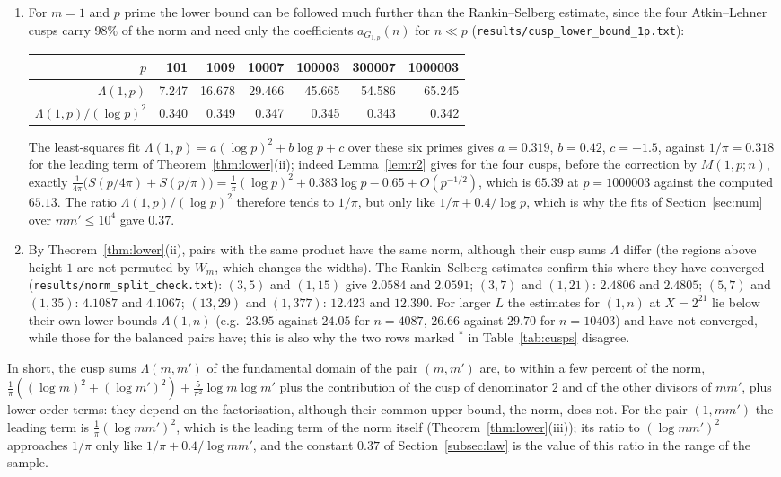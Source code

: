 ﻿\documentclass[11pt]{amsart}
\theoremstyle{remark}
\begin{document}
\begin{enumerate}[label=(\alph*),leftmargin=2.2em]
\item For $m=1$ and $p$ prime the lower bound can be followed much further than the Rankin--Selberg estimate, since the four Atkin--Lehner cusps carry $98\%$ of the norm and need only the coefficients $a_{G_{1,p}}(n)$ for $n\ll p$ (\texttt{results/cusp\_lower\_bound\_1p.txt}):
\begin{center}
\small
\begin{tabular}{r|rrrrrr}
$p$ & 101 & 1009 & 10007 & 100003 & 300007 & 1000003\\
\hline
$\Lambda(1,p)$ & 7.247 & 16.678 & 29.466 & 45.665 & 54.586 & 65.245\\
$\Lambda(1,p)/(\log p)^2$ & 0.340 & 0.349 & 0.347 & 0.345 & 0.343 & 0.342\\
\end{tabular}
\end{center}
The least-squares fit $\Lambda(1,p)=a(\log p)^2+b\log p+c$ over these six primes gives $a=0.319$, $b=0.42$, $c=-1.5$, against $1/\pi=0.318$ for the leading term of Theorem~\ref{thm:lower}(ii); indeed Lemma~\ref{lem:r2} gives for the four cusps, before the correction by $M(1,p;n)$, exactly $\frac1{4\pi}\bigl(S(p/4\pi)+S(p/\pi)\bigr)=\frac1\pi(\log p)^2+0.383\log p-0.65+O(p^{-1/2})$, which is $65.39$ at $p=1000003$ against the computed $65.13$. The ratio $\Lambda(1,p)/(\log p)^2$ therefore tends to $1/\pi$, but only like $1/\pi+0.4/\log p$, which is why the fits of Section~\ref{sec:num} over $mm'\le10^4$ gave $0.37$.
\item By Theorem~\ref{thm:lower}(ii), pairs with the same product have the same norm, although their cusp sums $\Lambda$ differ (the regions above height $1$ are not permuted by $W_m$, which changes the widths). The Rankin--Selberg estimates confirm this where they have converged (\texttt{results/norm\_split\_check.txt}): $(3,5)$ and $(1,15)$ give $2.0584$ and $2.0591$; $(3,7)$ and $(1,21)$: $2.4806$ and $2.4805$; $(5,7)$ and $(1,35)$: $4.1087$ and $4.1067$; $(13,29)$ and $(1,377)$: $12.423$ and $12.390$. For larger $L$ the estimates for $(1,n)$ at $X=2^{21}$ lie below their own lower bounds $\Lambda(1,n)$ (e.g.\ $23.95$ against $24.05$ for $n=4087$, $26.66$ against $29.70$ for $n=10403$) and have not converged, while those for the balanced pairs have; this is also why the two rows marked $^*$ in Table~\ref{tab:cusps} disagree.
\end{enumerate}
In short, the cusp sums $\Lambda(m,m')$ of the fundamental domain of the pair $(m,m')$ are, to within a few percent of the norm, $\frac1\pi((\log m)^2+(\log m')^2)+\frac5{\pi^2}\log m\log m'$ plus the contribution of the cusp of denominator $2$ and of the other divisors of $mm'$, plus lower-order terms: they depend on the factorisation, although their common upper bound, the norm, does not. For the pair $(1,mm')$ the leading term is $\frac1\pi(\log mm')^2$, which is the leading term of the norm itself (Theorem~\ref{thm:lower}(iii)); its ratio to $(\log mm')^2$ approaches $1/\pi$ only like $1/\pi+0.4/\log mm'$, and the constant $0.37$ of Section~\ref{subsec:law} is the value of this ratio in the range of the sample.
\end{document}
